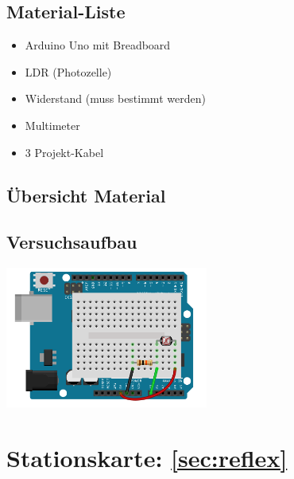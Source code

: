 \margininfo{}
\begin{multicols}{2}
\subsection*{Material-Liste}
\begin{itemize}
  \item Arduino Uno mit Breadboard
  \item LDR (Photozelle)
  \item Widerstand (muss bestimmt werden)
  \item Multimeter
  \item 3 Projekt-Kabel
\end{itemize}

\subsection*{Übersicht Material}

\vfill\null 
\columnbreak

\subsection*{Versuchsaufbau}

\includegraphics[width=0.5\textwidth]{Kapitel2/Bilder/LDR_bb}
\end{multicols}

\section*{Stationskarte: \ref{sec:reflex} }

